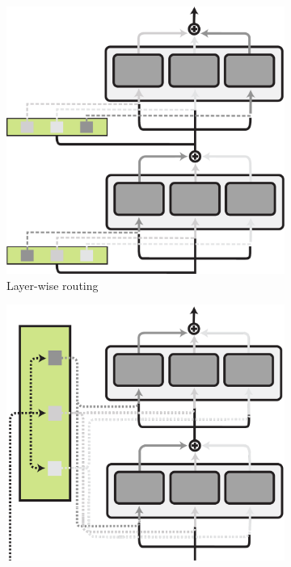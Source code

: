 \documentclass[10pt]{article} %
\begin{document}
\begin{figure}[t]
    \centering
    \begin{subfigure}{.30\linewidth}
    \centering
        \includegraphics[width=.99\linewidth]{img/layer_routing.pdf}  
        \caption{Layer-wise routing}
        \label{fig:routing:layer_routing}
        \end{subfigure}
            \begin{subfigure}{.30\linewidth}
    \centering
        \includegraphics[width=.99\linewidth]{img/naive_global_routing.pdf}  

\end{subfigure}
\end{figure}
\end{document}
